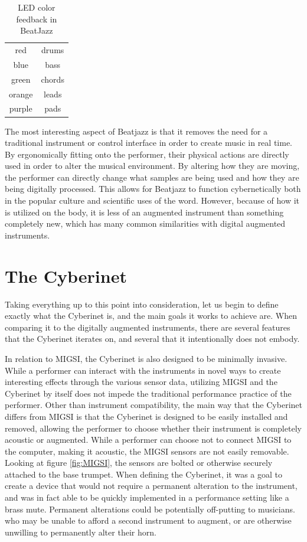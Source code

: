 \begin{table}[]
    \centering
    \begin{tabular}{|c||c|}
    \hline
      red   & drums \\
      blue   &  bass\\
      green & chords \\
      orange & leads\\
      purple & pads\\
      \hline
    \end{tabular}
    \caption{LED color feedback in BeatJazz}
    \label{tab:bjLEDs}
\end{table}


The most interesting aspect of Beatjazz is that it removes the need for a traditional instrument or control interface in order to create music in real time. By ergonomically fitting onto the performer, their physical actions are directly used in order to alter the musical environment. By altering how they are moving, the performer can directly change what samples are being used and how they are being digitally processed. This allows for Beatjazz to function cybernetically both in the popular culture and scientific uses of the word. However, because of how it is utilized on the body, it is less of an augmented instrument than something completely new, which has many common similarities with digital augmented instruments.

\section{The Cyberinet}


Taking everything up to this point into consideration, let us begin to define exactly what the Cyberinet is, and the main goals it works to achieve are. When comparing it to the digitally augmented instruments, there are several features that the Cyberinet iterates on, and several that it intentionally does not embody.

In relation to MIGSI, the Cyberinet is also designed to be minimally invasive. While a performer can interact with the instruments in novel ways to create interesting effects through the various sensor data, utilizing MIGSI and the Cyberinet by itself does not impede the traditional performance practice of the performer. Other than instrument compatibility, the main way that the Cyberinet differs from MIGSI is that the Cyberinet is designed to be easily installed and removed, allowing the performer to choose whether their instrument is completely acoustic or augmented. While a performer can choose not to connect MIGSI to the computer, making it acoustic, the MIGSI sensors are not easily removable. Looking at figure \ref{fig:MIGSI}, the sensors are bolted or otherwise securely attached to the base trumpet. When defining the Cyberinet, it was a goal to create a device that would not require a permanent alteration to the instrument, and was in fact able to be quickly implemented in a performance setting like a brass mute. Permanent alterations could be potentially off-putting to musicians. who may be unable to afford a second instrument to augment, or are otherwise unwilling to permanently alter their horn.

